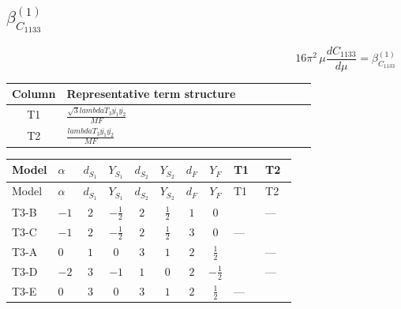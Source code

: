 \documentclass[8pt]{article}
\begin{document}
\begin{landscape}
\section*{$\beta_{C_{1133}}^{(1)}$}
\[16\pi^2\,\mu\frac{d C_{1133}}{d\mu}=\beta_{C_{1133}}^{(1)}\]
\begin{center}
\begin{tabular}{@{}c >{\raggedright\arraybackslash}p{0.82\linewidth}@{}}
\toprule
Column & Representative term structure \\
\midrule
T1 & \(\displaystyle \frac{\sqrt{3} lambdaT_{3} \overline{y_{1}} \overline{y_{2}}}{MF}\) \\
\midrule
T2 & \(\displaystyle \frac{lambdaT_{3} \overline{y_{1}} \overline{y_{2}}}{MF}\) \\
\midrule
\bottomrule
\end{tabular}
\end{center}
\smallskip
\tiny
\begin{longtable}{@{}llcccccc >{\raggedright\arraybackslash}p{0.21\linewidth} >{\raggedright\arraybackslash}p{0.21\linewidth}@{}}
\toprule
Model & $\alpha$ & $d_{S_1}$ & $Y_{S_1}$ & $d_{S_2}$ & $Y_{S_2}$ & $d_F$ & $Y_F$ & T1 & T2 \\
\midrule
\endfirsthead
\toprule
Model & $\alpha$ & $d_{S_1}$ & $Y_{S_1}$ & $d_{S_2}$ & $Y_{S_2}$ & $d_F$ & $Y_F$ & T1 & T2 \\
\midrule
\endhead
T3-B & $-1$ & $2$ & $-\frac{1}{2}$ & $2$ & $\frac{1}{2}$ & $1$ & $0$ & \scriptsize\adjustbox{max width=\linewidth}{$\begin{gathered} \frac{2 \sqrt{3} lambdaT_{3} \overline{y_{1}} \overline{y_{2}}}{3 MF}\end{gathered}$} & --- \\
\midrule
T3-C & $-1$ & $2$ & $-\frac{1}{2}$ & $2$ & $\frac{1}{2}$ & $3$ & $0$ & --- & \scriptsize\adjustbox{max width=\linewidth}{$\begin{gathered} - \frac{4 lambdaT_{3} \overline{y_{1}} \overline{y_{2}}}{3 MF}\end{gathered}$} \\
\midrule
T3-A & $0$ & $1$ & $0$ & $3$ & $1$ & $2$ & $\frac{1}{2}$ & \scriptsize\adjustbox{max width=\linewidth}{$\begin{gathered} \frac{2 \sqrt{3} lambdaT_{3} \overline{y_{1}} \overline{y_{2}}}{3 MF}\end{gathered}$} & --- \\
\midrule
T3-D & $-2$ & $3$ & $-1$ & $1$ & $0$ & $2$ & $-\frac{1}{2}$ & \scriptsize\adjustbox{max width=\linewidth}{$\begin{gathered} \frac{2 \sqrt{3} lambdaT_{3} \overline{y_{1}} \overline{y_{2}}}{3 MF}\end{gathered}$} & --- \\
\midrule
T3-E & $0$ & $3$ & $0$ & $3$ & $1$ & $2$ & $\frac{1}{2}$ & --- & \scriptsize\adjustbox{max width=\linewidth}{$\begin{gathered} - \frac{2 lambdaT_{3} \overline{y_{1}} \overline{y_{2}}}{MF}\end{gathered}$} \\
\midrule
\bottomrule
\end{longtable}
\clearpage

\end{landscape}
\end{document}
